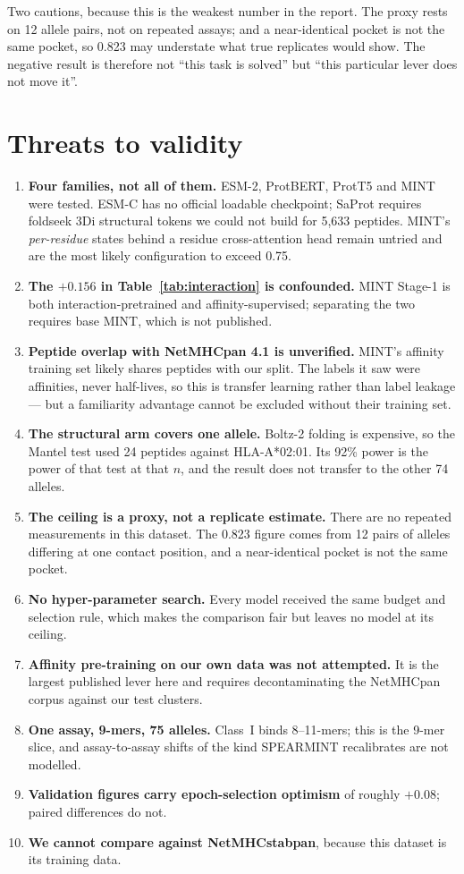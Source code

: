 \documentclass[11pt,a4paper]{article}
\begin{document}
Two cautions, because this is the weakest number in the report. The proxy rests on 12 allele
pairs, not on repeated assays; and a near-identical pocket is not the same pocket, so 0.823 may
understate what true replicates would show. The negative result is therefore not ``this task is
solved'' but ``this particular lever does not move it''.

\section{Threats to validity}

\begin{enumerate}[leftmargin=*,itemsep=2pt]
\item \textbf{Four families, not all of them.} ESM-2, ProtBERT, ProtT5 and MINT were tested.
  ESM-C has no official loadable checkpoint; SaProt requires foldseek 3Di structural tokens we
  could not build for 5{,}633 peptides. MINT's \emph{per-residue} states behind a residue
  cross-attention head remain untried and are the most likely configuration to exceed 0.75.
\item \textbf{The $+0.156$ in Table~\ref{tab:interaction} is confounded.} MINT Stage-1 is both
  interaction-pretrained and affinity-supervised; separating the two requires base MINT, which is
  not published.
\item \textbf{Peptide overlap with NetMHCpan 4.1 is unverified.} MINT's affinity training set
  likely shares peptides with our split. The labels it saw were affinities, never half-lives, so
  this is transfer learning rather than label leakage --- but a familiarity advantage cannot be
  excluded without their training set.
\item \textbf{The structural arm covers one allele.} Boltz-2 folding is expensive, so the Mantel
  test used 24 peptides against HLA-A*02:01. Its 92\% power is the power of that test at that
  $n$, and the result does not transfer to the other 74 alleles.
\item \textbf{The ceiling is a proxy, not a replicate estimate.} There are no repeated
  measurements in this dataset. The 0.823 figure comes from 12 pairs of alleles differing at one
  contact position, and a near-identical pocket is not the same pocket.
\item \textbf{No hyper-parameter search.} Every model received the same budget and selection rule,
  which makes the comparison fair but leaves no model at its ceiling.
\item \textbf{Affinity pre-training on our own data was not attempted.} It is the largest published
  lever here and requires decontaminating the NetMHCpan corpus against our test clusters.
\item \textbf{One assay, 9-mers, 75 alleles.} Class~I binds 8--11-mers; this is the 9-mer slice,
  and assay-to-assay shifts of the kind SPEARMINT recalibrates are not modelled.
\item \textbf{Validation figures carry epoch-selection optimism} of roughly $+0.08$; paired
  differences do not.
\item \textbf{We cannot compare against NetMHCstabpan}, because this dataset is its training data.
\end{enumerate}
\end{document}
